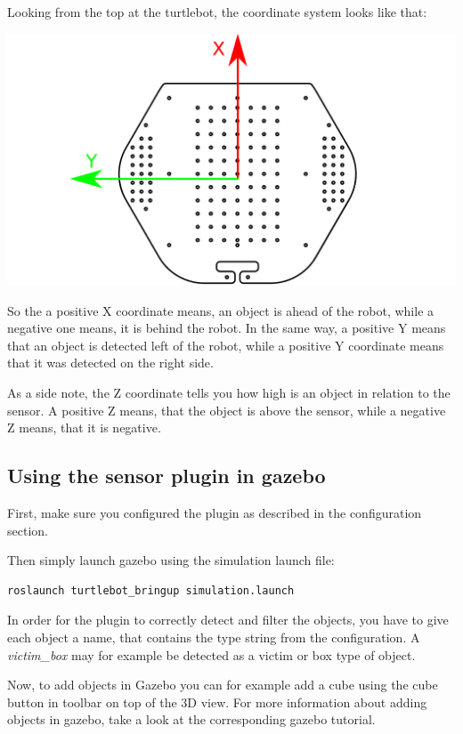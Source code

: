 Looking from the top at the turtlebot, the coordinate system looks like that:

\includegraphics[width=1.0\textwidth]{ttbtop.pdf}

So the a positive X coordinate means, an object is ahead of the robot,
while a negative one means, it is behind the robot.
In the same way, a positive Y means that an object is detected left of
the robot, while a positive Y coordinate means that it was detected on
the right side.

As a side note, the Z coordinate tells you how high is an object in
relation to the sensor. A positive Z means, that the object is above
the sensor, while a negative Z means, that it is negative.

\subsection{Using the sensor plugin in gazebo}

First, make sure you configured the plugin as described in the configuration
section.

Then simply launch gazebo using the simulation launch file:

\begin{verbatim}
roslaunch turtlebot_bringup simulation.launch
\end{verbatim}

In order for the plugin to correctly detect and filter the objects,
you have to give each object a name, that contains the type string
from the configuration. A \textit{victim\_box} may for example be detected 
as a victim or box type of object.

Now, to add objects in Gazebo you can for example add a cube using
the cube button in toolbar on top of the 3D view.
For more information about adding objects in gazebo, take a look
at the corresponding gazebo tutorial.

